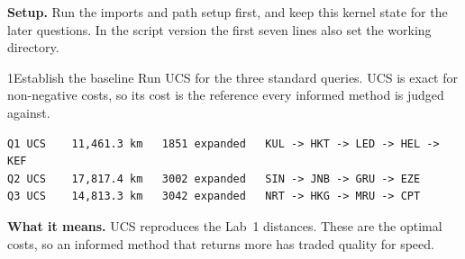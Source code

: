 \textbf{Setup.} Run the imports and path setup first, and keep this kernel state for the later questions. In the script version the first seven lines also set the working directory.



\begin{labquestion}{1}{Establish the baseline}
Run UCS for the three standard queries. UCS is exact for non-negative costs, so its cost is the reference every informed method is judged against.
\end{labquestion}
\begin{labanswer}


\begin{refoutput}
\begin{lstlisting}[style=utpterminal]
Q1 UCS    11,461.3 km   1851 expanded   KUL -> HKT -> LED -> HEL -> KEF
Q2 UCS    17,817.4 km   3002 expanded   SIN -> JNB -> GRU -> EZE
Q3 UCS    14,813.3 km   3042 expanded   NRT -> HKG -> MRU -> CPT
\end{lstlisting}
\end{refoutput}

\textbf{What it means.} UCS reproduces the Lab~1 distances. These are the optimal costs, so an informed method that returns more has traded quality for speed.
\end{labanswer}

